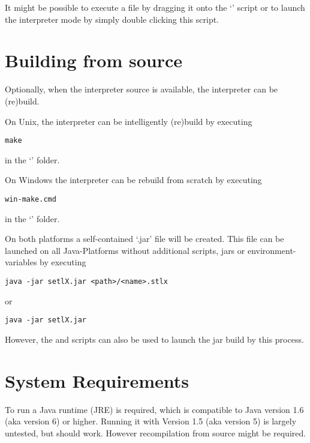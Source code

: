 It might be possible to execute a \SetlX{} file by dragging it onto the `' script or to launch the interpreter mode by simply double clicking this script.

\section{Building from source}

Optionally, when the interpreter source is available, the interpreter can be (re)build.

On Unix, the interpreter can be intelligently (re)build by executing

\begin{lstlisting}[frame=none,numbers=none]
make
\end{lstlisting}

in the `' folder.

On Windows the interpreter can be rebuild from scratch by executing
\begin{lstlisting}[frame=none,numbers=none]
win-make.cmd
\end{lstlisting}

in the `' folder.

On both platforms a self-contained `.jar' file will be created. This file can be launched on all Java-Platforms without additional scripts, jars or environment-variables by executing

\begin{lstlisting}[frame=none,numbers=none]
java -jar setlX.jar <path>/<name>.stlx
\end{lstlisting}

or

\begin{lstlisting}[frame=none,numbers=none]
java -jar setlX.jar
\end{lstlisting}

However, the  and  scripts can also be used to launch the jar build by this process.

\section{System Requirements}

To run \setlX{} a Java runtime (JRE) is required, which is compatible to Java version 1.6 (aka version 6) or higher. Running it with Version 1.5 (aka version 5) is largely untested, but should work. However recompilation from source might be required.

